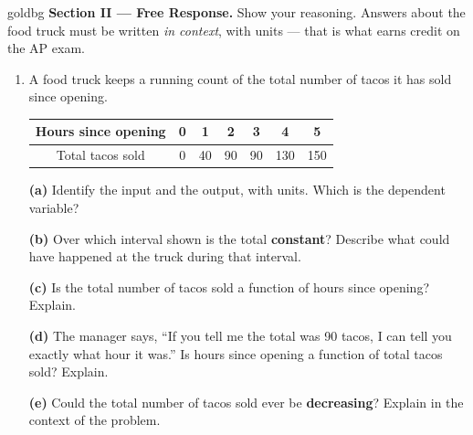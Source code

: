 \documentclass[10pt]{article}
\begin{document}
\newpage

\begin{headlinebox}{goldbg}
\small
\textbf{Section II --- Free Response.} Show your reasoning. Answers about the food truck must be
written \emph{in context}, with units --- that is what earns credit on the AP exam.
\end{headlinebox}

\vspace{0.08in}

\begin{enumerate}[leftmargin=1.9em, itemsep=10pt, start=6]

\item A food truck keeps a running count of the total number of tacos it has sold since opening.

      \smallskip
      \begin{center}
      \renewcommand{\arraystretch}{1.35}
      \begin{tabular}{|c|c|c|c|c|c|c|}
      \hline
      Hours since opening & 0 & 1  & 2  & 3  & 4   & 5 \\ \hline
      Total tacos sold    & 0 & 40 & 90 & 90 & 130 & 150 \\ \hline
      \end{tabular}
      \end{center}

      \textbf{(a)} Identify the input and the output, with units. Which is the dependent variable?
      \writespace{2.0cm}{}

      \textbf{(b)} Over which interval shown is the total \textbf{constant}? Describe what could
      have happened at the truck during that interval.
      \writespace{2.0cm}{}

      \textbf{(c)} Is the total number of tacos sold a function of hours since opening? Explain.
      \writespace{2.0cm}{}

      \textbf{(d)} The manager says, ``If you tell me the total was 90 tacos, I can tell you exactly
      what hour it was.'' Is hours since opening a function of total tacos sold? Explain.
      \writespace{2.4cm}{}

      \textbf{(e)} Could the total number of tacos sold ever be \textbf{decreasing}? Explain in the
      context of the problem.
      \writespace{2.4cm}{}

\end{enumerate}
\end{document}
